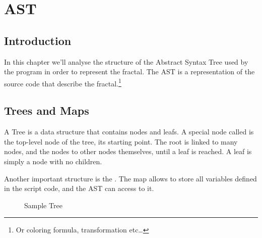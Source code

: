 \chapter{AST}

\section{Introduction}

In this chapter we'll analyse the structure of the Abstract Syntax Tree used by the program in order to represent the fractal. The AST is a representation of the source code that describe the fractal.\footnote{Or coloring formula, transformation etc\ldots{}}

\section{Trees and Maps}

A Tree is a data structure that contains nodes and leafs. A special node called  is the top-level node of the tree, its starting point. The root is linked to many nodes, and the nodes to other nodes themselves, until a leaf is reached. A leaf is simply a node with no children.

Another important structure is the . The map allows to store all variables defined in the script code, and the AST can access to it.

\begin{figure}
\centering

\label{fig:treesample}
\caption{Sample Tree}
\end{figure}






